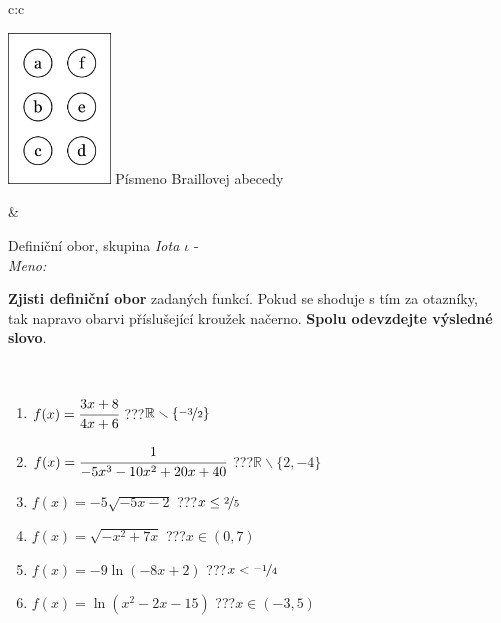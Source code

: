 \documentclass[10pt]{report}
\begin{document}
\begin{tabular}{c:c}
\begin{minipage}[c][104.5mm][t]{0.5\linewidth}
\begin{center}
\begin{minipage}{0.20\linewidth}
\begin{center}
\includegraphics[height=40mm]{../images/braille.png}
{\small Písmeno Braillovej abecedy}
\end{center}
\end{minipage}
\end{center}
\end{minipage}
&
\begin{minipage}[c][104.5mm][t]{0.5\linewidth}
\begin{center}
\vspace{7mm}
{\huge Definiční obor, skupina \textit{Iota $\iota$} -}\\[5mm]
\textit{Meno:}\phantom{xxxxxxxxxxxxxxxxxxxxxxxxxxxxxxxxxxxxxxxxxxxxxxxxxxxxxxxxxxxxxxxxx}\\[5mm]
\begin{minipage}{0.95\linewidth}
\textbf{Zjisti definiční obor} zadaných funkcí. Pokud se shoduje s tím za otazníky,\\tak napravo obarvi příslušející kroužek načerno. \textbf{Spolu odevzdejte výsledné slovo}.
\end{minipage}
\\[1mm]
\begin{minipage}{0.79\linewidth}
\begin{center}
\begin{varwidth}{\linewidth}
\begin{enumerate}
\normalsizerrr
\item $f(x)=\cfrac{3x+8}{4x+6}$\quad \dotfill\; ???\;\dotfill \quad $\mathbb{R}\smallsetminus\{\nicefrac{-3}{2}\}$
\item $f(x)=\cfrac{1}{-5x^3-10x^2+20x+40}$\quad \dotfill\; ???\;\dotfill \quad $\mathbb{R}\smallsetminus\{2,-4\}$
\item $f(x)=-5\sqrt{-5x-2}$\quad \dotfill\; ???\;\dotfill \quad $x\leq\nicefrac{2}{5}$
\item $f(x)=\sqrt{-x^2+7x}$\quad \dotfill\; ???\;\dotfill \quad $x\in(0 , 7)$
\item $f(x)=-9\ln{(-8x+2)}$\quad \dotfill\; ???\;\dotfill \quad $x<\nicefrac{-1}{4}$
\item $f(x)=\ln{(x^2-2x-15)}$\quad \dotfill\; ???\;\dotfill \quad $x\in(-3 , 5)$

\end{enumerate}
\end{varwidth}
\end{center}
\end{minipage}
\end{center}
\end{minipage}
\end{tabular}
\end{document}

